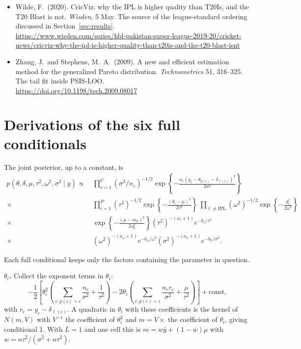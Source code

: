 \documentclass[11pt,a4paper]{article}
\begin{document}
\begin{itemize}[leftmargin=1.4em,itemsep=4pt]
  \emph{Wisden}, 25 April.\\
  \url{https://www.wisden.com/cricket-news/cricviz-an-analytical-guide-to-the-major-global-t20-leagues}
\item Wilde, F.\ (2020). CricViz: why the IPL is higher quality than T20Is, and the T20 Blast
  is not. \emph{Wisden}, 5 May. The source of the league-standard ordering discussed in
  Section~\ref{sec:results}.\\
  \url{https://www.wisden.com/series/hbl-pakistan-super-league-2019-20/cricket-news/cricviz-why-the-ipl-is-higher-quality-than-t20is-and-the-t20-blast-isnt}
\item Zhang, J.\ and Stephens, M.\ A.\ (2009). A new and efficient estimation method for the
  generalized Pareto distribution. \emph{Technometrics} 51, 316--325. The tail fit inside
  PSIS-LOO.\\
  \url{https://doi.org/10.1198/tech.2009.08017}
\end{itemize}

\newpage
\appendix
\section{Derivations of the six full conditionals}

The joint posterior, up to a constant, is
\begin{align*}
p(\theta,\delta,\mu,\tau^2,\omega^2,\sigma^2 \mid y) \propto\
& \prod_{c=1}^{C} (\sigma^2/n_c)^{-1/2}
  \exp\!\left\{-\frac{n_c (y_c - \theta_{p(c)} - \delta_{\ell(c)})^2}{2\sigma^2}\right\} \\
\times\ & \prod_{i=1}^{P} (\tau^2)^{-1/2}\exp\!\left\{-\frac{(\theta_i-\mu)^2}{2\tau^2}\right\}
\ \prod_{\ell \neq \mathrm{IPL}} (\omega^2)^{-1/2}
  \exp\!\left\{-\frac{\delta_\ell^2}{2\omega^2}\right\} \\
\times\ & \exp\!\left\{-\frac{(\mu-m_0)^2}{2 s_0^2}\right\}
  (\tau^2)^{-(a_\tau+1)}e^{-b_\tau/\tau^2} \\
\times\ & (\omega^2)^{-(a_\omega+1)}e^{-b_\omega/\omega^2}
  (\sigma^2)^{-(a_\sigma+1)}e^{-b_\sigma/\sigma^2}.
\end{align*}

Each full conditional keeps only the factors containing the parameter in question.

\textbf{$\theta_i$.} Collect the exponent terms in $\theta_i$:
\[
-\frac{1}{2}\left[\theta_i^2\left(\sum_{c:p(c)=i}\frac{n_c}{\sigma^2}+\frac{1}{\tau^2}\right)
-2\theta_i\left(\sum_{c:p(c)=i}\frac{n_c r_c}{\sigma^2}+\frac{\mu}{\tau^2}\right)\right] + \text{const},
\]
with $r_c = y_c - \delta_{\ell(c)}$. A quadratic in $\theta_i$ with these coefficients is the
kernel of $N(m, V)$ with $V^{-1}$ the coefficient of $\theta_i^2$ and $m = V \times$ the
coefficient of $\theta_i$, giving conditional 1. With $L=1$ and one cell this is
$m = w\bar{y} + (1-w)\mu$ with $w = n\tau^2/(\sigma^2+n\tau^2)$.
\end{document}
